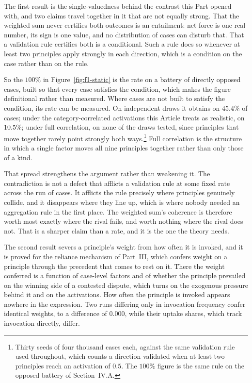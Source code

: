 \begin{table}[t]
\centering
\small
\caption{The five results, and the scope each is proved under.}
\label{tab:theorems}

\end{table}

The first result is the single-valuedness behind the contrast this Part opened
with, and two claims travel together in it that are not equally strong. That
the weighted sum never certifies both outcomes is an entailment: net force is
one real number, its sign is one value, and no distribution of cases can
disturb that. That a validation rule certifies both is a conditional. Such a
rule does so whenever at least two principles apply strongly in each
direction, which is a condition on the case rather than on the rule.

So the $100\%$ in Figure~\ref{fig:f1-static} is the rate on a battery of
directly opposed cases, built so that every case satisfies the condition, which makes the
figure definitional rather than measured. Where cases are not built to satisfy
the condition, its rate can be measured. On independent
draws it obtains on $45.4\%$ of cases; under the category-correlated
activations this Article treats as realistic, on $10.5\%$; under full correlation, on none of the draws tested, since principles that
move together rarely point strongly both ways.\footnote{Thirty seeds of four
thousand cases each, against the same validation rule used throughout, which
counts a direction validated when at least two principles reach an activation
of $0.5$. The $100\%$ figure is the same rule on the opposed battery of
Section~IV.A.} Full correlation is the structure in which a single factor
moves all nine principles together rather than only those of a kind.

That spread strengthens the argument rather than weakening it. The
contradiction is not a defect that afflicts a validation rule at some fixed
rate across the run of cases. It afflicts the rule precisely where principles
genuinely collide, and it disappears where they line up, which is where nobody
needed an aggregation rule in the first place. The weighted sum's coherence is
therefore worth most exactly where the rival fails, and worth nothing where
the rival does not. That is a sharper claim than a rate, and it is the one the
theory needs.

The second result severs a principle's weight from how often it is invoked,
and it is proved for the reliance mechanism of Part~III, which confers weight
on a principle through the precedent that comes to rest on it. There the
weight conferred is a function of case-level factors and of whether the
principle prevailed on the winning side of a contested dispute, which turns on
the exogenous pressure behind it and on the activations. How often the
principle is invoked appears nowhere in the expression. Two runs differing only in
invocation frequency confer identical weights, to a difference of $0.000$,
while their uptake shares, which track invocation directly, differ.

